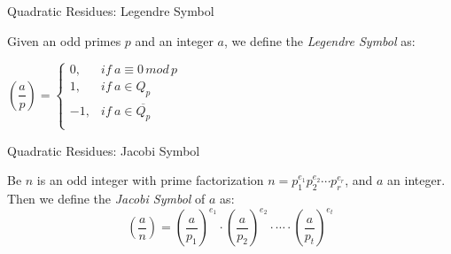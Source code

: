 \documentclass{beamer}
\begin{document}

\begin{frame}{Quadratic Residues: Legendre Symbol}
\begin{definition}
	Given an odd primes $p$ and an integer $a$, we define the \textit{Legendre Symbol} as:
	
	\begin{center}
		$
		\left( \dfrac{a}{p} \right) =
		\begin{cases}
		0, & if\ a \equiv 0 \, mod \, p\\
		1, & if\ a \in Q_p  \\
		-1, & if\ a \in \overline{Q_p} \\
		\end{cases}
		$
	\end{center}
\end{definition}
\end{frame}


%		


\begin{frame}{Quadratic Residues: Jacobi Symbol}
\begin{definition}
	Be $n$ is an odd integer with prime factorization $n = p_1^{e_1} p_2^{e_2} \cdots p_r^{e_r}$, and $a$ an integer. Then we define the \textit{Jacobi Symbol} of $a$ as:
	\[\left( \dfrac{a}{n} \right) = \left( \dfrac{a}{p_1} \right)^{e_1} \cdot \left( \dfrac{a}{p_2} \right)^{e_2} \cdot \cdots \cdot \left( \dfrac{a}{p_t} \right)^{e_t}\]
\end{definition}
\end{frame}
\end{document}
